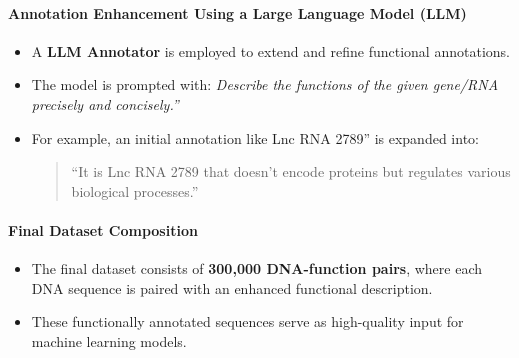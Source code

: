 \paragraph{Annotation Enhancement Using a Large Language Model (LLM)}

\begin{itemize}
\item A \textbf{LLM Annotator} is employed to extend and refine functional annotations.
\item The model is prompted with: \textit{Describe the functions of the given gene/RNA precisely and concisely.''}
    \item For example, an initial annotation like Lnc RNA 2789'' is expanded into:
\begin{quote}
``It is Lnc RNA 2789 that doesn't encode proteins but regulates various biological processes.''
\end{quote}
\end{itemize}

\paragraph{Final Dataset Composition}

\begin{itemize}
\item The final dataset consists of \textbf{300,000 DNA-function pairs}, where each DNA sequence is paired with an enhanced functional description.
\item These functionally annotated sequences serve as high-quality input for machine learning models.
\end{itemize}




